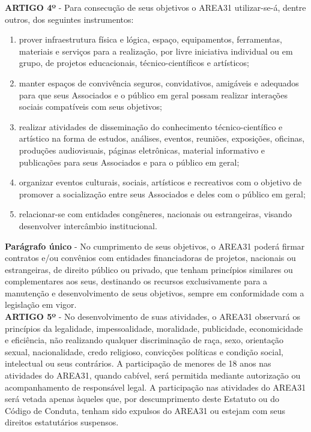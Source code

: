 \textbf{ARTIGO 4º} - Para consecução de seus objetivos o AREA31 utilizar-se-á, 
dentre outros, dos seguintes instrumentos:

\begin{enumerate}[label=\Roman* -]
    \item prover infraestrutura física e lógica, espaço, equipamentos, 
        ferramentas, materiais e serviços para a realização, 
        por livre iniciativa individual ou em grupo, de projetos educacionais,
        técnico-científicos e artísticos;
    \item manter espaços de convivência seguros, convidativos, amigáveis 
        e adequados para que seus Associados e o público em geral possam 
        realizar interações sociais compatíveis com seus objetivos;
    \item realizar atividades de disseminação do conhecimento 
        técnico-científico e artístico na forma de estudos, análises, 
        eventos, reuniões, exposições, oficinas, produções audiovisuais, 
        páginas eletrônicas, material informativo e publicações para seus 
        Associados e para o público em geral;
    \item organizar eventos culturais, sociais, artísticos e recreativos 
        com o objetivo de promover a socialização entre seus Associados 
        e deles com o público em geral; 
    \item relacionar-se com entidades congêneres, nacionais ou 
        estrangeiras, visando desenvolver intercâmbio institucional.
\end{enumerate}


\textbf{Parágrafo único} - No cumprimento de seus objetivos, o AREA31 poderá 
firmar contratos e/ou convênios com entidades financiadoras de projetos, 
nacionais ou estrangeiras, de direito público ou privado, que tenham 
princípios similares ou complementares aos seus, destinando os recursos 
exclusivamente para a manutenção e desenvolvimento de seus objetivos, 
sempre em conformidade com a legislação em vigor.
\\

\textbf{ARTIGO 5º} - No desenvolvimento de suas atividades, o AREA31 
observará os princípios da legalidade, impessoalidade, moralidade, 
publicidade, economicidade e eficiência, não realizando qualquer 
discriminação de raça, sexo, orientação sexual, nacionalidade, 
credo religioso, convicções políticas e condição social, intelectual ou 
seus contrários.
A participação de menores de 18 anos nas atividades do AREA31, quando cabível,
será permitida mediante autorização ou acompanhamento de responsável legal.
A participação nas atividades do AREA31 será vetada apenas àqueles que, 
por descumprimento deste Estatuto ou do Código de Conduta, tenham sido 
expulsos do AREA31 ou estejam com seus direitos estatutários suspensos.
